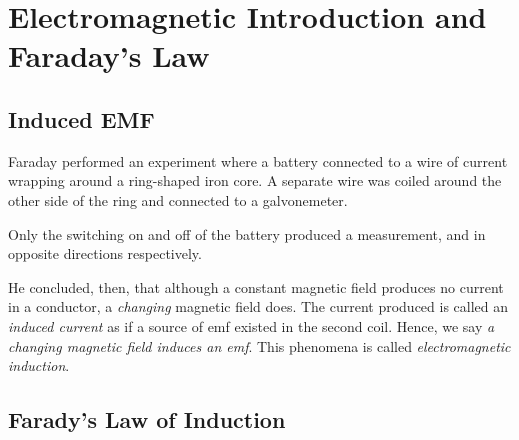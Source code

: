 \chapter{Electromagnetic Introduction and Faraday's Law}

\section{Induced EMF}

\begin{remark}
    Faraday performed an experiment where a battery connected to a wire of current wrapping around a ring-shaped iron core. A separate wire was coiled around the other side of the ring and connected to a galvonemeter.

    Only the switching on and off of the battery produced a measurement, and in opposite directions respectively.
\end{remark}
\begin{definition}
    He concluded, then, that although a constant magnetic field produces no current in a conductor, a \emph{changing} magnetic field does. The current produced is called an \emph{induced current} as if a source of emf existed in the second coil. Hence, we say \emph{a changing magnetic field induces an emf}. This phenomena is called \emph{electromagnetic induction}.
\end{definition}

\section{Farady's Law of Induction}

